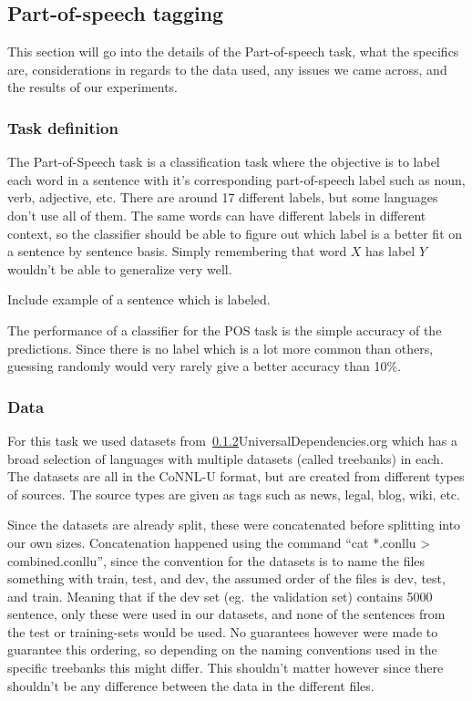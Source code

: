 
\subsection{Part-of-speech tagging}

This section will go into the details of the Part-of-speech task, what the
specifics are, considerations in regards to the data used, any issues we came
across, and the results of our experiments.

\subsubsection{Task definition}

The Part-of-Speech task is a classification task where the objective is to label
each word in a sentence with it's corresponding part-of-speech label such as
noun, verb, adjective, etc. There are around 17 different labels, but some
languages don't use all of them. The same words can have different labels in
different context, so the classifier should be able to figure out which label is
a better fit on a sentence by sentence basis. Simply remembering that word $X$
has label $Y$ wouldn't be able to generalize very well.

Include example of a sentence which is labeled.

The performance of a classifier for the POS task is the simple accuracy of the
predictions. Since there is no label which is a lot more common than others,
guessing randomly would very rarely give a better accuracy than 10\%.

\subsubsection{Data}

For this task we used datasets from~\ref{}{UniversalDependencies.org} which has
a broad selection of languages with multiple datasets (called treebanks) in
each. The datasets are all in the CoNNL-U format, but are created from different
types of sources. The source types are given as tags such as news, legal, blog,
wiki, etc.

Since the datasets are already split, these were concatenated before splitting
into our own sizes. Concatenation happened using the command ``cat *.conllu >
combined.conllu'', since the convention for the datasets is to name the files
something with train, test, and dev, the assumed order of the files is dev,
test, and train. Meaning that if the dev set (eg.\ the validation set) contains
5000 sentence, only these were used in our datasets, and none of the sentences
from the test or training-sets would be used. No guarantees however were made to
guarantee this ordering, so depending on the naming conventions used in the
specific treebanks this might differ. This shouldn't matter however since there
shouldn't be any difference between the data in the different files.

